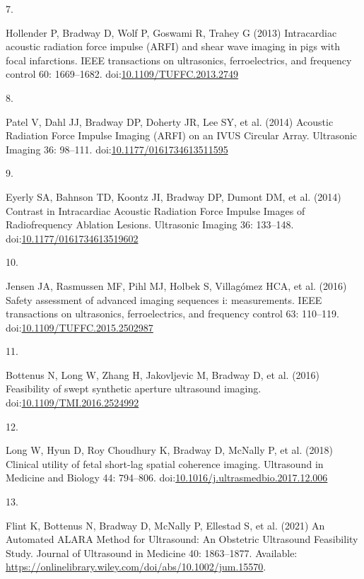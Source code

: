 \documentclass[
]{article}
\newlength{\cslhangindent}
\newlength{\csllabelwidth}
\newlength{\cslentryspacingunit} %
\newenvironment{CSLReferences}[2] %
 {%
  \setlength{\parindent}{0pt}
  \ifodd #1
  \let\oldpar\par
  \def\par{\hangindent=\cslhangindent\oldpar}
  \fi
  \setlength{\parskip}{#2\cslentryspacingunit}
 }%
 {}
\newcommand{\CSLLeftMargin}[1]{\parbox[t]{\csllabelwidth}{#1}}
\newcommand{\CSLRightInline}[1]{\parbox[t]{\linewidth - \csllabelwidth}{#1}\break}
\begin{document}
\begin{CSLReferences}{0}{0}
\leavevmode{}%
\CSLLeftMargin{7. }
\CSLRightInline{Hollender P, Bradway D, Wolf P, Goswami R, Trahey G
(2013) Intracardiac acoustic radiation force impulse (ARFI) and shear
wave imaging in pigs with focal infarctions. IEEE transactions on
ultrasonics, ferroelectrics, and frequency control 60: 1669--1682.
doi:\href{https://doi.org/10.1109/TUFFC.2013.2749}{10.1109/TUFFC.2013.2749}}

\leavevmode{}%
\CSLLeftMargin{8. }
\CSLRightInline{Patel V, Dahl JJ, Bradway DP, Doherty JR, Lee SY, et al.
(2014) {Acoustic Radiation Force Impulse Imaging (ARFI) on an IVUS
Circular Array}. Ultrasonic Imaging 36: 98--111.
doi:\href{https://doi.org/10.1177/0161734613511595}{10.1177/0161734613511595}}

\leavevmode{}%
\CSLLeftMargin{9. }
\CSLRightInline{Eyerly SA, Bahnson TD, Koontz JI, Bradway DP, Dumont DM,
et al. (2014) {Contrast in Intracardiac Acoustic Radiation Force Impulse
Images of Radiofrequency Ablation Lesions}. Ultrasonic Imaging 36:
133--148.
doi:\href{https://doi.org/10.1177/0161734613519602}{10.1177/0161734613519602}}

\leavevmode{}%
\CSLLeftMargin{10. }
\CSLRightInline{Jensen JA, Rasmussen MF, Pihl MJ, Holbek S, Villagómez
HCA, et al. (2016) Safety assessment of advanced imaging sequences i:
measurements. IEEE transactions on ultrasonics, ferroelectrics, and
frequency control 63: 110--119.
doi:\href{https://doi.org/10.1109/TUFFC.2015.2502987}{10.1109/TUFFC.2015.2502987}}

\leavevmode{}%
\CSLLeftMargin{11. }
\CSLRightInline{Bottenus N, Long W, Zhang H, Jakovljevic M, Bradway D,
et al. (2016) Feasibility of swept synthetic aperture ultrasound
imaging.
doi:\href{https://doi.org/10.1109/TMI.2016.2524992}{10.1109/TMI.2016.2524992}}

\leavevmode{}%
\CSLLeftMargin{12. }
\CSLRightInline{Long W, Hyun D, Roy Choudhury K, Bradway D, McNally P,
et al. (2018) {Clinical utility of fetal short-lag spatial coherence
imaging}. Ultrasound in Medicine and Biology 44: 794--806.
doi:\href{https://doi.org/10.1016/j.ultrasmedbio.2017.12.006}{10.1016/j.ultrasmedbio.2017.12.006}}

\leavevmode{}%
\CSLLeftMargin{13. }
\CSLRightInline{Flint K, Bottenus N, Bradway D, McNally P, Ellestad S,
et al. (2021) {An Automated ALARA Method for Ultrasound: An Obstetric
Ultrasound Feasibility Study}. Journal of Ultrasound in Medicine 40:
1863--1877. Available:
\url{https://onlinelibrary.wiley.com/doi/abs/10.1002/jum.15570}.}


\end{CSLReferences}
\end{document}
